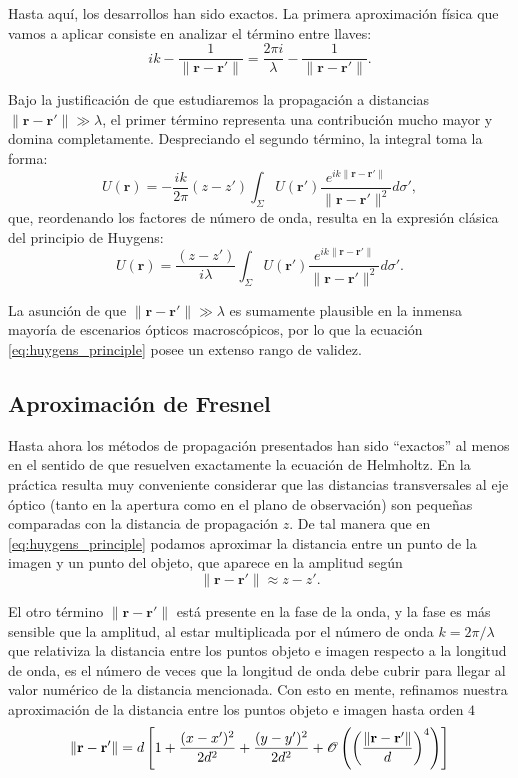 \documentclass[12pt,a4paper]{article}
\numberwithin{equation}{section}
\begin{document}
Hasta aquí, los desarrollos han sido exactos. La primera aproximación física que vamos a aplicar consiste en analizar el término entre llaves:
\begin{equation}
ik - \frac{1}{\|\mathbf{r}-\mathbf{r}'\|} = \frac{2\pi i}{\lambda} - \frac{1}{\|\mathbf{r}-\mathbf{r}'\|}.
\end{equation}

Bajo la justificación de que estudiaremos la propagación a distancias $\|\mathbf{r}-\mathbf{r}'\| \gg \lambda$, el primer término representa una contribución mucho mayor y domina completamente. Despreciando el segundo término, la integral toma la forma:
\begin{equation}
U(\mathbf{r}) = -\frac{ik}{2\pi} (z-z') \int_{\Sigma} U(\mathbf{r}') \frac{e^{ik\|\mathbf{r}-\mathbf{r}'\|}}{\|\mathbf{r}-\mathbf{r}'\|^2} d\sigma',
\end{equation}
que, reordenando los factores de número de onda, resulta en la expresión clásica del principio de Huygens:
\begin{equation}
U(\mathbf{r}) = \frac{(z-z')}{i\lambda} \int_{\Sigma} U(\mathbf{r}') \frac{e^{ik\|\mathbf{r}-\mathbf{r}'\|}}{\|\mathbf{r}-\mathbf{r}'\|^2} d\sigma'.
\label{eq:huygens_principle}
\end{equation}

La asunción de que $\|\mathbf{r}-\mathbf{r}'\| \gg \lambda$ es sumamente plausible en la inmensa mayoría de escenarios ópticos macroscópicos, por lo que la ecuación \eqref{eq:huygens_principle} posee un extenso rango de validez.


\subsection{Aproximación de Fresnel}

Hasta ahora los métodos de propagación presentados han sido ``exactos'' al menos en el sentido de que resuelven exactamente la ecuación de Helmholtz.
En la práctica resulta muy conveniente considerar que las distancias transversales al eje óptico (tanto en la apertura como en el plano de observación) son pequeñas comparadas con la distancia de propagación $z$.
De tal manera que en \eqref{eq:huygens_principle} podamos aproximar la distancia entre un punto de la imagen y un punto del objeto, que aparece en la amplitud según
\begin{equation}
\|\mathbf{r}-\mathbf{r}'\| \approx z-z'.
\end{equation}

El otro término $\|\mathbf{r}-\mathbf{r}'\|$ está presente en la fase de la onda, y la fase es más sensible que la amplitud, al estar multiplicada por el número de onda $k = 2\pi/\lambda$ que relativiza la distancia entre los puntos objeto e imagen respecto a la longitud de onda, es el número de veces que la longitud de onda debe cubrir para llegar al valor numérico de la distancia mencionada.
Con esto en mente, refinamos nuestra aproximación de la distancia entre los puntos objeto e imagen hasta orden $4$
$$\|\mathbf{r}-\mathbf{r}'\| = d \left[ 1 + \frac{(x-x')^2}{2d^2} + \frac{(y-y')^2}{2d^2} + \mathscr O\left( \left( \frac{\| \vb r - \vb r' \|}{d}\right)^4 \right) \right]$$
\end{document}
